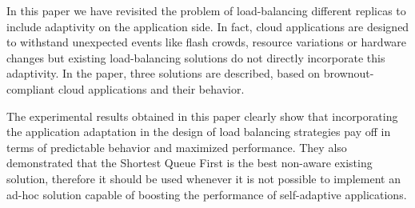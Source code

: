 In this paper we have revisited the problem of load-balancing
different replicas to include adaptivity on the application side. In
fact, cloud applications are designed to withstand unexpected events
like flash crowds, resource variations or hardware changes but
existing load-balancing solutions do not directly incorporate this
adaptivity. In the paper, three solutions are described, based on
brownout-compliant cloud applications and their behavior.

The experimental results obtained in this paper clearly show that
incorporating the application adaptation in the design of load
balancing strategies pay off in terms of predictable behavior and
maximized performance. They also demonstrated that the Shortest Queue
First is the best non-aware existing solution, therefore it should be
used whenever it is not possible to implement an ad-hoc solution
capable of boosting the performance of self-adaptive applications.
